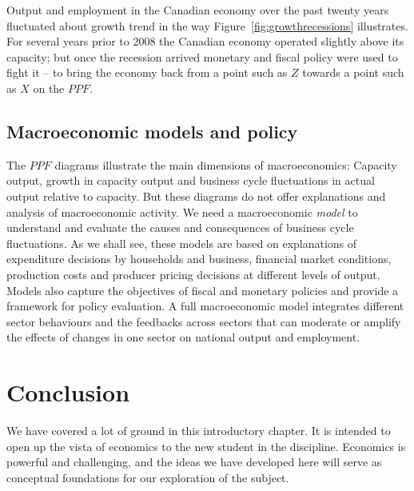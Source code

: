 Output and employment in the Canadian economy over the past twenty years
fluctuated about growth trend in the way Figure~\ref{fig:growthrecessions}
illustrates. For several years prior to 2008 the Canadian economy operated
slightly above its capacity; but once the recession arrived monetary and
fiscal policy were used to fight it -- to bring the economy back from a
point such as $Z$ towards a point such as $X$ on the $PPF$.

\subsection*{Macroeconomic models and policy}

The $PPF$ diagrams illustrate the main dimensions of macroeconomics:
Capacity output, growth in capacity output and business cycle fluctuations
in actual output relative to capacity. But these diagrams do not offer
explanations and analysis of macroeconomic activity. We need a macroeconomic 
\textit{model} to understand and evaluate the causes and consequences of
business cycle fluctuations. As we shall see, these models are based on
explanations of expenditure decisions by households and business, financial
market conditions, production costs and producer pricing decisions at
different levels of output. Models also capture the objectives of fiscal and
monetary policies and provide a framework for policy evaluation. A full
macroeconomic model integrates different sector behaviours and the feedbacks
across sectors that can moderate or amplify the effects of changes in one
sector on national output and employment.

\section*{Conclusion}

We have covered a lot of ground in this introductory chapter. It is intended
to open up the vista of economics to the new student in the discipline.
Economics is powerful and challenging, and the ideas we have developed here
will serve as conceptual foundations for our exploration of the subject. 